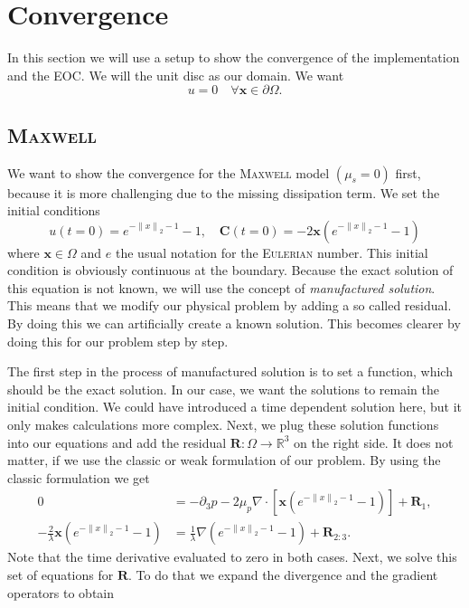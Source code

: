 \documentclass[12pt,a4paper,twoside, open=right]{scrreprt}
\theoremstyle{definition}
\theoremstyle{plain}
\newcommand{\rr}{\mathbb{R}}
\newcommand{\norm}[1]{\left\lVert#1\right\rVert}
\newcommand{\bfC}{\bm{C}}
\newcommand{\bfx}{\bm{x}}
\newcommand{\bfR}{\bm{R}}
\begin{document}
\section{Convergence}
In this section we will use a setup to show the convergence of the implementation and the EOC. We will the unit disc as our domain. We want 
\begin{equation}
    u = 0\quad\forall\bfx\in\partial\Omega.
\end{equation}
\subsection{\textsc{Maxwell}}
We want to show the convergence for the \textsc{Maxwell} model $(\mu_s=0)$ first, because it is more challenging due to the missing dissipation term.
We set the initial conditions
\begin{equation}
    u(t=0) = e^{-\norm{x}_2-1}-1,
    \quad\bfC(t=0) = -2\bfx(e^{-\norm{x}_2 -1}-1)
\end{equation}
where $\bfx\in\Omega$ and $e$ the usual notation for the \textsc{Eulerian} number. This initial condition is obviously continuous at the boundary. Because the exact solution of this equation is not known, we will use the concept of \emph{manufactured solution}. This means that we modify our physical problem by adding a so called residual. By doing this we can artificially create a known solution. This becomes clearer by doing this for our problem step by step.\par 
The first step in the process of manufactured solution is to set a function, which should be the exact solution. In our case, we want the solutions to remain the initial condition. We could have introduced a time dependent solution here, but it only makes calculations more complex. Next, we plug these solution functions into our equations and add the residual $\bfR\colon\Omega\to\rr^3$ on the right side. It does not matter, if we use the classic or weak formulation of our problem. By using the classic formulation we get
\begin{align}
    0 &= -\partial_3 p-2\mu_p \nabla\cdot [\bfx(e^{-\norm{x}_2 -1}-1)] +\bfR_1,\\
    -\frac{2}{\lambda}\bfx(e^{-\norm{x}_2 -1}-1)&= \frac{1}{\lambda}\nabla (e^{-\norm{x}_2 -1}-1) +\bfR_{2:3}.
\end{align}
Note that the time derivative evaluated to zero in both cases. Next, we solve this set of equations for $\bfR$. To do that we expand the divergence and the gradient operators to obtain
\end{document}
